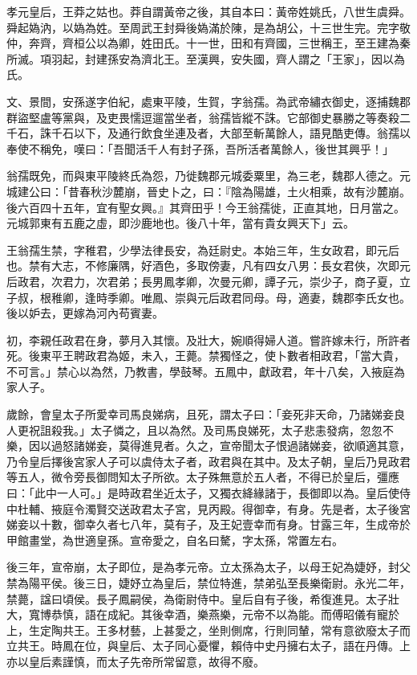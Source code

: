 
\begin{pinyinscope}
孝元皇后，王莽之姑也。莽自謂黃帝之後，其自本曰：黃帝姓姚氏，八世生虞舜。舜起媯汭，以媯為姓。至周武王封舜後媯滿於陳，是為胡公，十三世生完。完字敬仲，奔齊，齊桓公以為卿，姓田氏。十一世，田和有齊國，三世稱王，至王建為秦所滅。項羽起，封建孫安為濟北王。至漢興，安失國，齊人謂之「王家」，因以為氏。

文、景間，安孫遂字伯紀，處東平陵，生賀，字翁孺。為武帝繡衣御史，逐捕魏郡群盜堅盧等黨與，及吏畏懦逗遛當坐者，翁孺皆縱不誅。它部御史暴勝之等奏殺二千石，誅千石以下，及通行飲食坐連及者，大部至斬萬餘人，語見酷吏傳。翁孺以奉使不稱免，嘆曰：「吾聞活千人有封子孫，吾所活者萬餘人，後世其興乎！」

翁孺既免，而與東平陵終氏為怨，乃徙魏郡元城委粟里，為三老，魏郡人德之。元城建公曰：「昔春秋沙麓崩，晉史卜之，曰：『陰為陽雄，土火相乘，故有沙麓崩。後六百四十五年，宜有聖女興。』其齊田乎！今王翁孺徙，正直其地，日月當之。元城郭東有五鹿之虛，即沙鹿地也。後八十年，當有貴女興天下」云。

王翁孺生禁，字稚君，少學法律長安，為廷尉史。本始三年，生女政君，即元后也。禁有大志，不修廉隅，好酒色，多取傍妻，凡有四女八男：長女君俠，次即元后政君，次君力，次君弟；長男鳳孝卿，次曼元卿，譚子元，崇少子，商子夏，立子叔，根稚卿，逢時季卿。唯鳳、崇與元后政君同母。母，適妻，魏郡李氏女也。後以妒去，更嫁為河內苟賓妻。

初，李親任政君在身，夢月入其懷。及壯大，婉順得婦人道。嘗許嫁未行，所許者死。後東平王聘政君為姬，未入，王薨。禁獨怪之，使卜數者相政君，「當大貴，不可言。」禁心以為然，乃教書，學鼓琴。五鳳中，獻政君，年十八矣，入掖庭為家人子。

歲餘，會皇太子所愛幸司馬良娣病，且死，謂太子曰：「妾死非天命，乃諸娣妾良人更祝詛殺我。」太子憐之，且以為然。及司馬良娣死，太子悲恚發病，忽忽不樂，因以過怒諸娣妾，莫得進見者。久之，宣帝聞太子恨過諸娣妾，欲順適其意，乃令皇后擇後宮家人子可以虞侍太子者，政君與在其中。及太子朝，皇后乃見政君等五人，微令旁長御問知太子所欲。太子殊無意於五人者，不得已於皇后，彊應曰：「此中一人可。」是時政君坐近太子，又獨衣絳緣諸于，長御即以為。皇后使侍中杜輔、掖庭令濁賢交送政君太子宮，見丙殿。得御幸，有身。先是者，太子後宮娣妾以十數，御幸久者七八年，莫有子，及王妃壹幸而有身。甘露三年，生成帝於甲館畫堂，為世適皇孫。宣帝愛之，自名曰驁，字太孫，常置左右。

後三年，宣帝崩，太子即位，是為孝元帝。立太孫為太子，以母王妃為婕妤，封父禁為陽平侯。後三日，婕妤立為皇后，禁位特進，禁弟弘至長樂衛尉。永光二年，禁薨，諡曰頃侯。長子鳳嗣侯，為衛尉侍中。皇后自有子後，希復進見。太子壯大，寬博恭慎，語在成紀。其後幸酒，樂燕樂，元帝不以為能。而傅昭儀有寵於上，生定陶共王。王多材藝，上甚愛之，坐則側席，行則同輦，常有意欲廢太子而立共王。時鳳在位，與皇后、太子同心憂懼，賴侍中史丹擁右太子，語在丹傳。上亦以皇后素謹慎，而太子先帝所常留意，故得不廢。


\end{pinyinscope}

